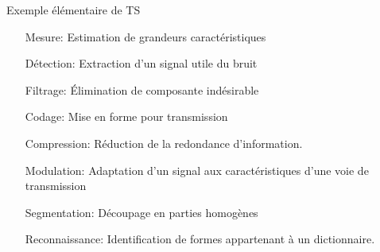 \documentclass[handout]{beamer}
\begin{document}
\begin{frame}{Exemple élémentaire de TS}
  \setlength{\leftmargini}{2.5cm}         %
  \begin{itemize}
    \item[Mesure:\pause] Estimation de grandeurs caractéristiques\pause
    \item[Détection:\pause] Extraction d'un signal utile du bruit\pause
    \item[Filtrage:\pause] Élimination de composante indésirable\pause
    \item[Codage:\pause] Mise en forme pour transmission\pause
    \item[Compression:\pause] Réduction de la redondance d'information.\pause
    \item[Modulation:\pause] Adaptation d'un signal aux caractéristiques d'une voie de transmission\pause
    \item[Segmentation:\pause] Découpage en parties homogènes\pause
    \item[Reconnaissance:\pause] Identification de formes appartenant à un dictionnaire.\pause
  \end{itemize}
\end{frame}
\end{document}
